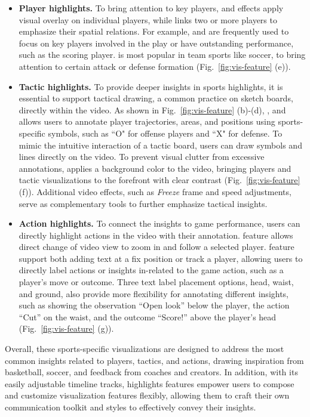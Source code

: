 \begin{itemize}[leftmargin=*]
    \item \textbf{Player highlights.} To bring attention to key players, \Circle{} and \Spotlight{} effects apply visual overlay on individual players, while \Connector{} links two or more players to emphasize their spatial relations. For example, \Circle{} and \Spotlight{} are frequently used to focus on key players involved in the play or have outstanding performance, such as the scoring player. \Connector{} is most popular in team sports like soccer, to bring attention to certain attack or defense formation (Fig.~\ref{fig:vis-feature} (e)).

    \item \textbf{Tactic highlights.} To provide deeper insights in sports highlights, it is essential to support tactical drawing, a common practice on sketch boards, directly within the video. As shown in Fig.~\ref{fig:vis-feature} (b)-(d), \Path{}, \Zone{} and \Marker{} allows users to annotate player trajectories, areas, and positions using sports-specific symbols, such as ``O" for offense players and ``X" for defense. To mimic the intuitive interaction of a tactic board, users can draw symbols and lines directly on the video. To prevent visual clutter from excessive annotations,
\BGFilter{} applies a background color to the video, bringing players and tactic visualizations to the forefront with clear contrast (Fig.~\ref{fig:vis-feature} (f)). Additional video effects, such as \textit{Freeze} frame and speed adjustments, serve as complementary tools to further emphasize tactical insights.

    \item \textbf{Action highlights.} 
To connect the insights to game performance, users can directly highlight actions in the video with their annotation. \Zoom{} feature allows direct change of video view to zoom in and follow a selected player. 
\Text{} feature support both adding text at a fix position or track a player, allowing users to directly label actions or insights in-related to the game action, such as a player's move or outcome. Three text label placement options, head, waist, and ground, also provide more flexibility for annotating different insights, such as showing the observation ``Open look'' below the player, the action ``Cut'' on the waist, and the outcome ``Score!'' above the player's head (Fig.~\ref{fig:vis-feature} (g)).
\end{itemize}

Overall, these sports-specific visualizations are designed to address the most common insights related to players, tactics, and actions, drawing inspiration from basketball, soccer, and feedback from coaches and creators. 
In addition, with its easily adjustable timeline tracks, \SB{} highlights features empower users to compose and customize visualization features flexibly, allowing them to craft their own communication toolkit and styles to effectively convey their insights.


